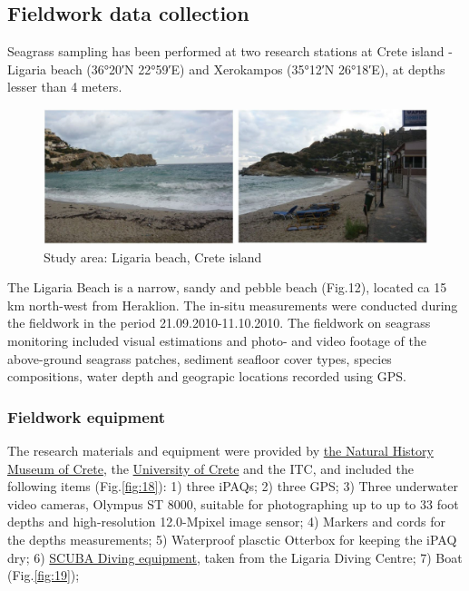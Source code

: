 \documentclass[10pt, a4paper]{article}
\begin{document}
\subsection{Fieldwork data collection}
Seagrass sampling has been performed at two research stations at Crete island - Ligaria beach
(36°20′N 22°59′E) and Xerokampos (35°12′N 26°18′E), at depths lesser than 4 meters. 

\begin{figure}[h]
	\centering
	\includegraphics[scale=0.25]{Fig-17.jpg}
	\caption{Study area: Ligaria beach, Crete island}
	\label{fig:17}
\end{figure}

The Ligaria Beach is a narrow, sandy and pebble beach (Fig.12), located ca 15 km north-west from Heraklion.
The in-situ measurements were conducted during the fieldwork in the period 21.09.2010-11.10.2010.
The fieldwork on seagrass monitoring included visual estimations and photo- and video footage of the
above-ground seagrass patches, sediment seafloor cover types, species compositions, water depth and
geograpic locations recorded using GPS.
\pagebreak

\subsubsection{Fieldwork equipment}
The research materials and equipment were provided by \href{http://www.nhmc.uoc.gr/index-2.htm}{the Natural History Museum of Crete}, the \href{http://www.uoc.gr/Department/index.html}{University of Crete} and the ITC, and included the following items (Fig.\ref{fig:18}): 1) three iPAQs; 2)
three GPS; 3) Three underwater video cameras, Olympus ST 8000, suitable for
photographing up to up to 33 foot depths and high-resolution 12.0-Mpixel image sensor; 4)
Markers and cords for the depths measurements; 5) Waterproof plasctic Otterbox for keeping the
iPAQ dry; 6) \href{http://www.padi.com/scuba/}{SCUBA Diving equipment}, taken from the Ligaria Diving Centre; 7) Boat (Fig.\ref{fig:19}); 
\end{document}
